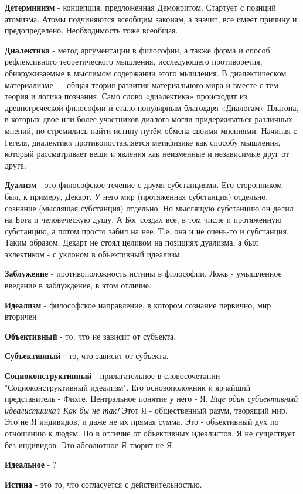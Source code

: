 \documentclass[12pt,a4paper]{article}
\begin{document}
\textbf{Детерминизм} - концепция, предложенная Демокритом. Стартует с позиций атомизма. Атомы подчиняются всеобщим законам, а значит, все имеет причину и предопределено. Необходимость тоже всеобщая.

\textbf{Диалектика} - метод аргументации в философии, а также форма и способ рефлексивного теоретического мышления, исследующего противоречия, обнаруживаемые в мыслимом содержании этого мышления. В диалектическом материализме — общая теория развития материального мира и вместе с тем теория и логика познания. Само слово «диалектика» происходит из древнегреческой философии и стало популярным благодаря «Диалогам» Платона, в которых двое или более участников диалога могли придерживаться различных мнений, но стремились найти истину путём обмена своими мнениями. Начиная с Гегеля, диалектикa противопоставляется метафизике как способу мышления, который рассматривает вещи и явления как неизменные и независимые друг от друга.

\textbf{Дуализм} - это философское течение с двумя субстанциями. Его сторонником был, к примеру, Декарт. У него мир (протяженная субстанция) отдельно, сознание (мыслящая субстанция) отдельно. Но мыслящую субстанцию он делил на Бога и человеческую душу. А Бог создал все, в том числе и протяженную субстанцию, а потом просто забил на нее. Т.е. она и не очень-то и субстанция. Таким образом, Декарт не стоял целиком на позициях дуализма, а был эклектиком - с уклоном в объективный идеализм. 

\textbf{Заблужение} - противоположность истины в философии. Ложь - умышленное введение в заблуждение, в этом отличие.

\textbf{Идеализм} - философское направление, в котором сознание первично, мир вторичен.

\textbf{Объективный} - то, что не зависит от субъекта.

\textbf{Субъективный} - то, что зависит от субъекта.

\textbf{Социоконструктивный} - прилагательное в словосочетании "Социоконструктивный идеализм". Его основоположник и ярчайший представитель - Фихте. Центральное понятие у него - Я. \textit{Еще один субъективный идеалистишка? Как бы не так!} Этот Я - общественный разум, творящий мир. Это не Я индивидов, и даже не их прямая сумма. Это - объективный дух по отношению к людям. Но в отличие от объективных идеалистов, Я не существует без индивидов. Это абсолютное Я творит не-Я.

\textbf{Идеальное} - ?

\textbf{Истина} - это то, что согласуется с действительностью.
\end{document}
